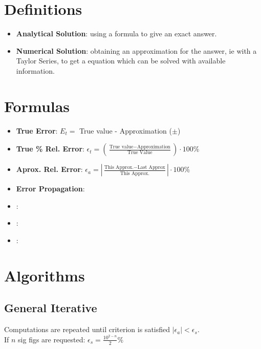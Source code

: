 \documentclass[fontsize=4pt]{scrartcl}
\begin{document}
\begin{multicols}{4}
  \section{Definitions}
    \begin{itemize}
      \item \textbf{Analytical Solution}: using a formula to give an exact answer.
      \item \textbf{Numerical Solution}: obtaining an approximation for the answer, 
            ie with a Taylor Series, to get a equation which can be solved with available
            information.
    \end{itemize}

  \section{Formulas}
    \parbox{\columnwidth}
    {
      \begin{itemize}
        \item \textbf{True Error}: $E_t =$ True value - Approximation ($\pm$)
        \item \textbf{True \% Rel. Error}: $\epsilon_t = (\frac{\text{True value} - \text{Approximation}}{\text{True Value}})\cdot100\%$
        \item \textbf{Aprox. Rel. Error}: $\epsilon_a =  |\frac{\text{This Approx.} - \text{Last Approx}}{\text{This Approx.}}|\cdot100\%$
        \item \textbf{Error Propagation}: 
        \item \textbf{}: 
        \item \textbf{}: 
        \item \textbf{}: 
      \end{itemize}
    }
  
  \columnbreak

  \section{Algorithms}
    \subsection{General Iterative}
      Computations are repeated until criterion is satisfied $|\epsilon_a| < \epsilon_s$. \\
      If $n$ sig figs are requested: $\epsilon_s = \frac{10^{2-n}}{2}\%$ \\

\end{multicols}
\end{document}
